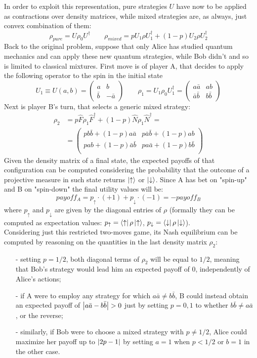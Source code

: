 In order to exploit this representation, pure strategies $U$ have now to be applied as contractions over density matrices, while mixed strategies are, as always, just convex combination of them:
\[ \rho_{pure} = U\rho_0U^\dagger \qquad \rho_{mixed}=pU_1\rho U_1^\dagger+(1-p)U_2\rho U_2^\dagger \]
Back to the original problem, suppose that only Alice has studied quantum mechanics and can apply these new quantum strategies, while Bob didn't and so is limited to classical mixtures. First move is of player A, that decides to apply the following operator to the spin in the initial state
\[ U_1 \equiv U(a,b) = \begin{pmatrix} a&b\\\bar{b}&-\bar{a}\end{pmatrix} \qquad \rho_1 = U_1\rho_0U_1^\dagger = \begin{pmatrix} a\bar{a}&ab\\\bar{a}\bar{b}&b\bar{b}\end{pmatrix} \]
Next is player B's turn, that selects a generic mixed strategy:
\[ \begin{aligned} \rho_2 &= p\hat{F}\rho_1\hat{F}^\dagger + (1-p)\hat{N}\rho_1\hat{N}^\dagger =\\
&= \begin{pmatrix} pb\bar{b}+(1-p)a\bar{a}&p\bar{a}\bar{b}+(1-p)ab\\ pab +(1-p)\bar{a}\bar{b}&pa\bar{a}+(1-p)b\bar{b}\\ \end{pmatrix} \end{aligned} \]
Given the density matrix of a final state, the expected payoffs of that configuration can be computed considering the probability that the outcome of a projective measure in such state returns $\ket{\uparrow}$ or $\ket{\downarrow}$. Since A has bet on "spin-up" and B on "spin-down" the final utility values will be:
\[ payoff_A = p_\uparrow\cdot(+1) + p_\downarrow\cdot(-1) = -payoff_B \]
where $p_\uparrow$ and $p_\downarrow$ are given by the diagonal entries of $\rho$ (formally they can be computed as expectation values: $p_\uparrow=\bra{\uparrow}\rho\ket{\uparrow}$, $p_\downarrow=\bra{\downarrow}\rho\ket{\downarrow}$).\\
Considering just this restricted two-moves game, its Nash equilibrium can be computed by reasoning on the quantities in the last density matrix $\rho_2$:
\begin{itemize}[noitemsep]
	\item[-] setting $p=1/2$, both diagonal terms of $\rho_2$ will be equal to $1/2$, meaning that Bob's strategy would lead him an expected payoff of 0, independently of Alice's actions;
	\item[-] if A were to employ any strategy for which $a\bar{a}\neq b\bar{b}$, B could instead obtain an expected payoff of $\abs{a\bar{a}-b\bar{b}}>0$ just by setting $p=0,1$ to whether $b\bar{b}\neq a\bar{a}$, or the reverse;
	\item[-] similarly, if Bob were to choose a mixed strategy with $p\neq 1/2$, Alice could maximize her payoff up to $\abs{2p-1}$ by setting $a=1$ when $p<1/2$ or $b=1$ in the other case. 
\end{itemize}
